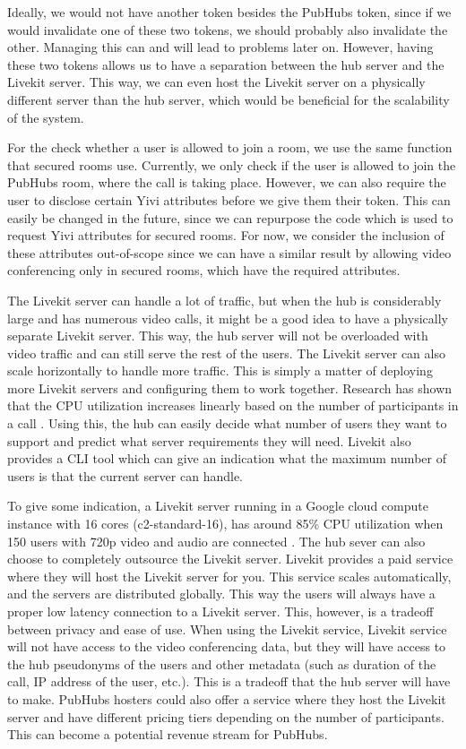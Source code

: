 \documentclass{report}
\begin{document}
Ideally, we would not have another token besides the PubHubs token, since if we would invalidate one of these two
tokens, we should probably also invalidate the other. Managing this can and will lead to problems later on. However,
having these two tokens allows us to have a separation between the hub server and the Livekit server. This way, we
can even host the Livekit server on a physically different server than the hub server, which would be beneficial for
the scalability of the system.

For the check whether a user is allowed to join a room, we use the same function that secured rooms use. Currently,
we only check if the user is allowed to join the PubHubs room, where the call is taking place. However, we can also
require the user to disclose certain Yivi attributes before we give them their token. This can easily be changed in the
future, since we can repurpose the code which is used to request Yivi attributes for secured rooms. For now, we consider
the inclusion of these attributes out-of-scope since we can have a similar result by allowing video conferencing
only in secured rooms, which have the required attributes.

The Livekit server can handle a lot of traffic, but when the hub is considerably large and has numerous video calls, it
might be a good idea to have a physically separate Livekit server. This way, the hub server will not be overloaded with
video traffic and can still serve the rest of the users. The Livekit server can also scale horizontally to handle
more traffic. This is simply a matter of deploying more Livekit servers and configuring them to work together.
Research has shown that the CPU utilization increases linearly based on the number of participants in a call
\cite{muscariello_securing_2023}. Using this, the hub can easily decide what number of users
they want to support and predict what server requirements they will need. Livekit also provides a CLI tool which
can give an indication what the maximum number of users is that the current server can handle.

To give some indication, a Livekit server running in a Google cloud compute instance with 16 cores
(c2-standard-16), has around 85\% CPU utilization when 150 users with 720p video and audio are connected
\cite{noauthor_benchmarking_nodate}. The hub sever can also choose to completely outsource the Livekit server.
Livekit provides a paid service where they will host the Livekit server for you. This service scales
automatically, and the servers are distributed globally. This way the users will always have a proper low
latency connection to a Livekit server. This, however, is a tradeoff between privacy and ease of use. When using
the Livekit service, Livekit service will not have access to the video conferencing data, but they will have access to
the hub pseudonyms of the users and other metadata (such as duration of the call, IP address of the user, etc.). This
is a tradeoff that the hub server will have to make. PubHubs hosters could also offer a service where they host the
Livekit server and have different pricing tiers depending on the number of participants. This can become a potential
revenue stream for PubHubs.
\end{document}
